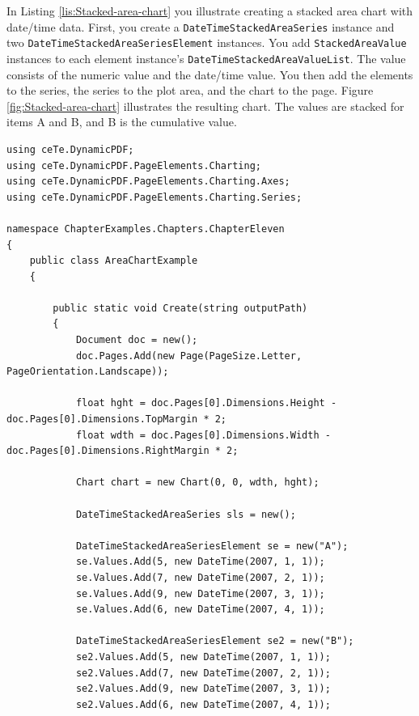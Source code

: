 \documentclass[american]{tufte-book}
\numberwithin{equation}{section}
\numberwithin{figure}{section}
\begin{document}
{In Listing \ref{lis:Stacked-area-chart} you illustrate creating a
stacked area chart with date/time data. First, you create a \texttt{DateTimeStackedAreaSeries}
instance and two \texttt{DateTimeStackedAreaSeriesElement} instances.
You add \texttt{StackedAreaValue} instances to each element instance’s
\texttt{DateTimeStackedAreaValueList}. The value consists of the numeric
value and the date/time value. You then add the elements to the series,
the series to the plot area, and the chart to the page. Figure \ref{fig:Stacked-area-chart}
illustrates the resulting chart. The values are stacked for items
A and B, and B is the cumulative value.

\bgroup{}
\begin{lstlisting}[caption={Stacked area chart with date/time data.},label={lis:Stacked-area-chart},basicstyle={\footnotesize\ttfamily},breaklines=true]
using ceTe.DynamicPDF;
using ceTe.DynamicPDF.PageElements.Charting;
using ceTe.DynamicPDF.PageElements.Charting.Axes;
using ceTe.DynamicPDF.PageElements.Charting.Series;

namespace ChapterExamples.Chapters.ChapterEleven
{
    public class AreaChartExample
    {

        public static void Create(string outputPath)
        {
            Document doc = new();
            doc.Pages.Add(new Page(PageSize.Letter, PageOrientation.Landscape));

            float hght = doc.Pages[0].Dimensions.Height - doc.Pages[0].Dimensions.TopMargin * 2;
            float wdth = doc.Pages[0].Dimensions.Width - doc.Pages[0].Dimensions.RightMargin * 2;

            Chart chart = new Chart(0, 0, wdth, hght);

            DateTimeStackedAreaSeries sls = new();

            DateTimeStackedAreaSeriesElement se = new("A");
            se.Values.Add(5, new DateTime(2007, 1, 1));
            se.Values.Add(7, new DateTime(2007, 2, 1));
            se.Values.Add(9, new DateTime(2007, 3, 1));
            se.Values.Add(6, new DateTime(2007, 4, 1));

            DateTimeStackedAreaSeriesElement se2 = new("B");
            se2.Values.Add(5, new DateTime(2007, 1, 1));
            se2.Values.Add(7, new DateTime(2007, 2, 1));
            se2.Values.Add(9, new DateTime(2007, 3, 1));
            se2.Values.Add(6, new DateTime(2007, 4, 1));


\end{lstlisting}}
\end{document}
